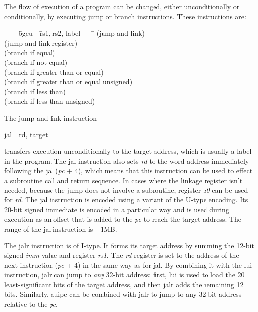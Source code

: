 \documentclass[11pt, twoside, pdftex]{article}
\newenvironment{ctabbing}%
{\begin{center}\begin{minipage}{\textwidth}\begin{tabbing}}
{\end{tabbing}\end{minipage}\end{center}}
\begin{document}
The flow of execution of a program can be changed, either unconditionally or
conditionally, by executing jump or branch instructions.  These instructions are:

\begin{ctabbing}
~~~~\={\sf bgeu}~~\={\sf rs1, rs2, label}~~~~\=\kill
{}  \>(jump and link)\\
  \>(jump and link register)\\
  \>(branch if equal)\\
  \>(branch if not equal)\\
  \>(branch if greater than or equal)\\
  \>(branch if greater than or equal unsigned)\\
  \>(branch if less than)\\
  \>(branch if less than unsigned)
\end{ctabbing}
\noindent
The jump and link instruction
\vspace{-\baselineskip}
\begin{center}
{\sf jal~~rd, target}
\end{center}
\noindent
transfers execution unconditionally to the target address, which is usually a label in the
program. The {\sf jal} instruction also sets {\it rd} to the
word address immediately following the {\sf jal} ({\it pc} + 4), which means that this 
instruction can be used to effect a subroutine call and return sequence. In cases where the 
linkage register isn't needed, because the jump does not involve a subroutine, register {\it x0} 
can be used for {\it rd}. The {\sf jal} instruction is encoded using a variant of 
the U-type encoding. Its 20-bit signed immediate is encoded in a particular way and is used 
during execution as an offset that is added to the {\it pc} to reach the target address.
The range of the {\sf jal} instruction is $\pm 1$MB.
 
The {\sf jalr} instruction is of I-type. It forms its target address by summing the
12-bit signed {\it imm} value and register {\it rs1}. The {\it rd} register is set to the
address of the next instruction ({\it pc} + 4) in the same way as for {\sf jal}. 
By combining it with the {\sf lui} instruction, {\sf jalr} can jump to {\it any} 32-bit address:
first, {\sf lui} is used to load the 20 least-significant bits of the target address, and 
then {\sf jalr} adds the remaining 12 bits. Similarly, {\sf auipc} can be combined with
{\sf jalr} to jump to any 32-bit address relative to the {\it pc}. 
\end{document}
